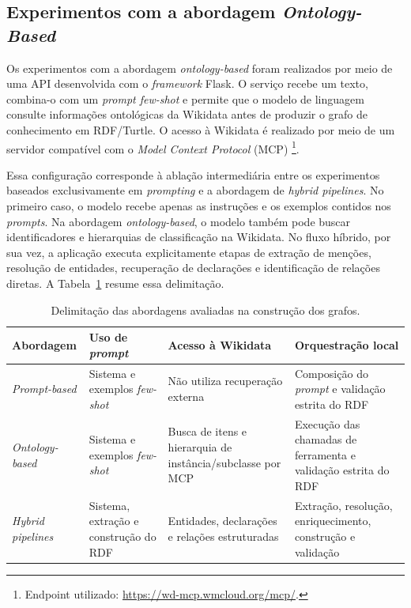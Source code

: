 
\subsection{Experimentos com a abordagem \textit{Ontology-Based}}

Os experimentos com a abordagem \textit{ontology-based} foram realizados por
meio de uma API desenvolvida com o \textit{framework} Flask. O serviço recebe um
texto, combina-o com um \textit{prompt few-shot} e permite que o modelo de
linguagem consulte informações ontológicas da Wikidata antes de produzir o
grafo de conhecimento em RDF/Turtle. O acesso à Wikidata é realizado por meio
de um servidor compatível com o \textit{Model Context Protocol} (MCP)%
\footnote{Endpoint utilizado: \url{https://wd-mcp.wmcloud.org/mcp/}.}.

Essa configuração corresponde à ablação intermediária entre os experimentos
baseados exclusivamente em \textit{prompting} e a abordagem de
\textit{hybrid pipelines}. No primeiro caso, o modelo recebe apenas as
instruções e os exemplos contidos nos \textit{prompts}. Na abordagem
\textit{ontology-based}, o modelo também pode buscar identificadores e
hierarquias de classificação na Wikidata. No fluxo híbrido, por sua vez, a
aplicação executa explicitamente etapas de extração de menções, resolução de
entidades, recuperação de declarações e identificação de relações diretas. A
Tabela~\ref{tab:comparacao-ablacoes-kg} resume essa delimitação.

\begin{table}[htbp]
\centering
\caption{Delimitação das abordagens avaliadas na construção dos grafos.}
\label{tab:comparacao-ablacoes-kg}
\small
\renewcommand{\arraystretch}{1.25}
\begin{tabular}{p{3.4cm}p{3.2cm}p{3.4cm}p{4.1cm}}
\toprule
\textbf{Abordagem} &
\textbf{Uso de \textit{prompt}} &
\textbf{Acesso à Wikidata} &
\textbf{Orquestração local} \\
\midrule
\textit{Prompt-based} &
Sistema e exemplos \textit{few-shot} &
Não utiliza recuperação externa &
Composição do \textit{prompt} e validação estrita do RDF \\
\textit{Ontology-based} &
Sistema e exemplos \textit{few-shot} &
Busca de itens e hierarquia de instância/subclasse por MCP &
Execução das chamadas de ferramenta e validação estrita do RDF \\
\textit{Hybrid pipelines} &
Sistema, extração e construção do RDF &
Entidades, declarações e relações estruturadas &
Extração, resolução, enriquecimento, construção e validação \\
\bottomrule
\end{tabular}
\end{table}

